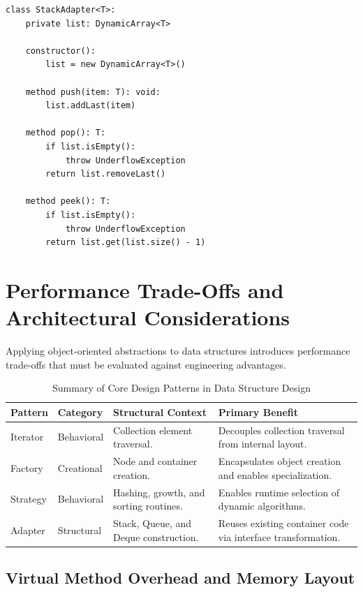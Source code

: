 \documentclass[12pt]{report}
\begin{document}
\begin{verbatim}
class StackAdapter<T>:
    private list: DynamicArray<T>

    constructor():
        list = new DynamicArray<T>()

    method push(item: T): void:
        list.addLast(item)

    method pop(): T:
        if list.isEmpty():
            throw UnderflowException
        return list.removeLast()

    method peek(): T:
        if list.isEmpty():
            throw UnderflowException
        return list.get(list.size() - 1)
\end{verbatim}

\section{Performance Trade-Offs and Architectural Considerations}

Applying object-oriented abstractions to data structures introduces performance trade-offs that must be evaluated against engineering advantages.

\begin{table}[htbp]
\centering
\caption{Summary of Core Design Patterns in Data Structure Design}
\label{tab:design_patterns_summary}
\begin{tabularx}{\textwidth}{>{\raggedright\arraybackslash}p{2.2cm} >{\raggedright\arraybackslash}p{2.0cm} X X}
\toprule
\textbf{Pattern} & \textbf{Category} & \textbf{Structural Context} & \textbf{Primary Benefit} \\
\midrule
Iterator & Behavioral & Collection element traversal. & Decouples collection traversal from internal layout. \\
Factory & Creational & Node and container creation. & Encapsulates object creation and enables specialization. \\
Strategy & Behavioral & Hashing, growth, and sorting routines. & Enables runtime selection of dynamic algorithms. \\
Adapter & Structural & Stack, Queue, and Deque construction. & Reuses existing container code via interface transformation. \\
\bottomrule
\end{tabularx}
\end{table}

\subsection{Virtual Method Overhead and Memory Layout}
\end{document}
